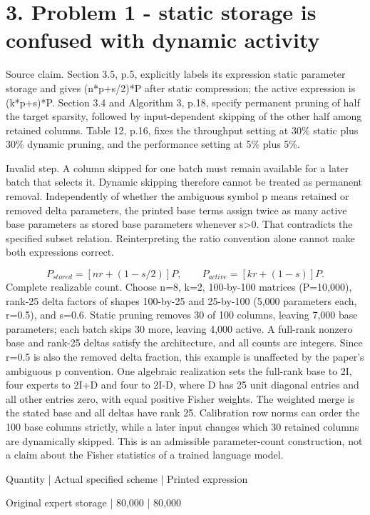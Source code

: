 \documentclass[10pt]{article}
\begin{document}
\section*{3. Problem 1 - static storage is confused with dynamic activity}
Source claim. Section 3.5, p.5, explicitly labels its expression static parameter storage and gives (n*p+s/2)*P after static compression; the active expression is (k*p+s)*P. Section 3.4 and Algorithm 3, p.18, specify permanent pruning of half the target sparsity, followed by input-dependent skipping of the other half among retained columns. Table 12, p.16, fixes the throughput setting at 30\% static plus 30\% dynamic pruning, and the performance setting at 5\% plus 5\%.\par
Invalid step. A column skipped for one batch must remain available for a later batch that selects it. Dynamic skipping therefore cannot be treated as permanent removal. Independently of whether the ambiguous symbol p means retained or removed delta parameters, the printed base terms assign twice as many active base parameters as stored base parameters whenever s>0. That contradicts the specified subset relation. Reinterpreting the ratio convention alone cannot make both expressions correct.\par
\[P_{stored}=[nr+(1-s/2)]P,\qquad P_{active}=[kr+(1-s)]P.\] Complete realizable count. Choose n=8, k=2, 100-by-100 matrices (P=10,000), rank-25 delta factors of shapes 100-by-25 and 25-by-100 (5,000 parameters each, r=0.5), and s=0.6. Static pruning removes 30 of 100 columns, leaving 7,000 base parameters; each batch skips 30 more, leaving 4,000 active. A full-rank nonzero base and rank-25 deltas satisfy the architecture, and all counts are integers. Since r=0.5 is also the removed delta fraction, this example is unaffected by the paper’s ambiguous p convention. One algebraic realization sets the full-rank base to 2I, four experts to 2I+D and four to 2I-D, where D has 25 unit diagonal entries and all other entries zero, with equal positive Fisher weights. The weighted merge is the stated base and all deltas have rank 25. Calibration row norms can order the 100 base columns strictly, while a later input changes which 30 retained columns are dynamically skipped. This is an admissible parameter-count construction, not a claim about the Fisher statistics of a trained language model.\par
Quantity | Actual specified scheme | Printed expression\par
Original expert storage | 80,000 | 80,000\par
\end{document}

